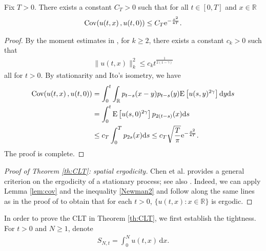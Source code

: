 \documentclass[12pt, reqno]{amsart}
\newcommand{\R}{{\mathbb{R}}}
\newcommand{\E}{\mathrm{E}}
\renewcommand{\d}{\mathrm{d}}
\newcommand{\<}{\langle}
\renewcommand{\>}{\rangle}
\newcommand{\e}{\mathrm{e}}
\DeclareMathOperator{\Cov}{\text{\rm Cov}}
\begin{document}
\begin{lemma}\label{lem:cov}
          Fix $T>0$. There exists a constant $C_T>0$ such that for all $t\in [0, T]$ and $x\in \R$
          \begin{align*}
          \Cov(u(t,x)\,, u(t,0)) \leq C_T\e^{-\frac{x^2}{4T}}.
          \end{align*}
\end{lemma}
\begin{proof}
  By the moment estimates in \cite[Theorem 1.6]{CX23},  for $k\geq2$, there exists a constant $c_k>0$ such that
\begin{align}\label{eq:moment}
\|u(t,x)\|_k^2 \leq c_k t^{\frac{1}{2(1-\gamma)}}
\end{align}
all for $t>0$.  By stationarity and Ito's isometry, we have
\begin{align*}
          \Cov(u(t, x)\,, u(t,0))& = \int_0^t\int_\R p_{t-s}(x-y)p_{t-s}(y)\E\left[u(s,y)^{2\gamma}\right]\d y\d s\\
          &=\int_0^t \E\left[u(s,0)^{2\gamma}\right] p_{2(t-s)}(x)\d s\\
          &\le c_{T} \int_0^Tp_{2s}(x)\d s \leq c_T \sqrt{\frac{T}{\pi}}\e^{-\frac{x^2}{4T}}.
\end{align*}
The proof is complete.
\end{proof}

\begin{proof}[Proof of Theorem \ref{th:CLT}: spatial ergodicity] 
          Chen et al. \cite[Lemma 7.2]{CKNP21} provides a general criterion on the ergodicity of a stationary process; see also \cite[Lemma 4.2]{BaZ24}. Indeed, we can apply Lemma \ref{lem:cov} and the inequality \eqref{Newman2} and follow along 
          the same lines as in the proof of \cite[Theorem 1.1]{Pu25} to obtain that for each $t>0$, $\{u(t,x):x \in \R\}$ is ergodic.
\end{proof}

In order to prove the CLT in Theorem \ref{th:CLT}, we first establish the tightness. For $t>0$ and $N\geq1$, denote 
\begin{align}\label{eq:int}
S_{N,t} = \int_0^N u(t,x) \, \d x. 
\end{align}
\end{document}

